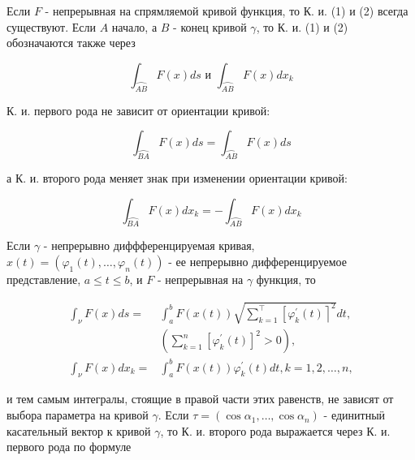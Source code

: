 \documentclass[10pt]{article}
\begin{document}
Если $F$ - непрерывная на спрямляемой кривой функция, то К. и. (1) и (2) всегда существуют. Если $A$ начало, а $B$ - конец кривой $\gamma$, то К. и. (1) и (2) обозначаются также через



\[

\int_{\overparen{A B}} F(x) d s \text { и } \int_{\overparen{A B}} F(x) d x_{k}

\]



К. и. первого рода не зависит от ориентации кривой:



\[

\int_{\overparen{B A}} F(x) d s=\int_{\overparen{A B}} F(x) d s

\]



а К. и. второго рода меняет знак при изменении ориентации кривой:



\[

\int_{\overparen{B A}} F(x) d x_{k}=-\int_{\overparen{A B}} F(x) d x_{k}

\]



Если $\gamma$ - непрерывно диффференцируемая кривая, $x(t)=\left(\varphi_{1}(t), \ldots, \varphi_{n}(t)\right)$ - ее непрерывно дифференцируемое представление, $a \leqslant t \leqslant b$, и $F$ - непрерывная на $\gamma$ функция, то



\[

\begin{aligned}

\int_{\nu} F(x) d s= & \int_{a}^{b} F(x(t)) \sqrt{\sum_{k=1}^{\top}\left[\varphi_{k}^{\prime}(t)\right\rceil^{2}} d t, \\

& \left(\sum_{k=1}^{n}\left[\varphi_{k}^{\prime}(t)\right]^{2}>0\right), \\

\int_{\nu} F(x) d x_{k}= & \int_{a}^{b} F(x(t)) \varphi_{k}^{\prime}(t) d t, k=1,2, \ldots, n,

\end{aligned}

\]



и тем самым интегралы, стоящие в правой части этих равенств, не зависят от выбора параметра на кривой $\gamma$. Если $\tau=\left(\cos \alpha_{1}, \ldots, \cos \alpha_{n}\right)$ - единитныӥ касательный вектор к кривой $\gamma$, то К. и. второго рода выражается через К. и. первого рода по формуле
\end{document}
